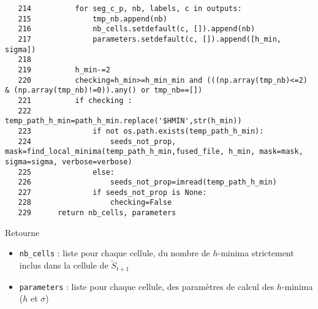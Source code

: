 \documentclass{article}
\def \mycolor {red}
\begin{document}
\color{black}
\begin{verbatim}  
   214	        for seg_c_p, nb, labels, c in outputs:
   215	            tmp_nb.append(nb)
   216	            nb_cells.setdefault(c, []).append(nb)
   217	            parameters.setdefault(c, []).append([h_min, sigma])
   218	
   219	        h_min-=2
   220	        checking=h_min>=h_min_min and (((np.array(tmp_nb)<=2) & (np.array(tmp_nb)!=0)).any() or tmp_nb==[])
   221	        if checking :
   222	            temp_path_h_min=path_h_min.replace('$HMIN',str(h_min))
   223	            if not os.path.exists(temp_path_h_min):
   224	                seeds_not_prop, mask=find_local_minima(temp_path_h_min,fused_file, h_min, mask=mask, sigma=sigma, verbose=verbose)
   225	            else:
   226	                seeds_not_prop=imread(temp_path_h_min)
   227	            if seeds_not_prop is None:
   228	                checking=False
   229	    return nb_cells, parameters
\end{verbatim}
\color{\mycolor}
Retourne
\begin{itemize}
\itemsep -0.5ex
\item \verb|nb_cells| : liste pour chaque cellule, du nombre de $h$-minima strictement inclus dans la cellule de  $\tilde{S}_{t+1}$
\item \verb|parameters| : liste pour chaque cellule,  des param\`etres de calcul des $h$-minima ($h$ et $\sigma$)
\end{itemize}
\color{black}
\end{document}
